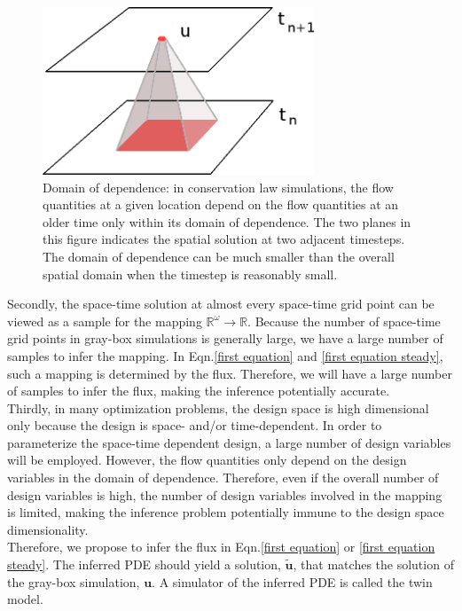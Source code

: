 \documentclass[a4paper,onecolumn]{article}
\theoremstyle{remark}
\begin{document}
\begin{figure}[H]\begin{center}
    \includegraphics[height=5cm]{locality.png}
    \caption{Domain of dependence: in conservation law simulations,
             the flow quantities at a given location
             depend on the flow quantities at an older time only within its
             domain of dependence. The two planes in this figure indicates the spatial 
             solution at two adjacent timesteps.
             The domain of dependence can be much smaller
             than the overall spatial domain when the timestep is reasonably small.}
    \label{locality}
\end{center}\end{figure}

\indent Secondly, the space-time solution at almost {every} space-time grid point can be viewed
as a sample for the mapping $\mathbb{R}^\omega \rightarrow \mathbb{R}$. 
Because the number of space-time grid points in gray-box simulations is generally large,
we have a large number of samples to infer the mapping. 
In Eqn.\eqref{first equation} and \eqref{first equation steady},
such a mapping is determined by the flux.
Therefore, we will have a large number of samples to infer the flux,
making the inference potentially accurate.\\

\indent Thirdly, in many optimization problems, the design space is high dimensional only because
the design is space- and/or time-dependent. In order to parameterize the space-time dependent
design, a large number of design variables will be employed. However, 
the flow quantities only depend on the design variables in the domain of dependence.
Therefore, even if the overall number of design variables is high, the number of design variables
involved in the mapping is limited, making the inference problem potentially
immune to the design space dimensionality.\\

\indent Therefore, we propose to infer the flux in Eqn.\eqref{first equation} or
\eqref{first equation steady}. The inferred
PDE should yield a solution, $\tilde{\boldsymbol{u}}$, that matches 
the solution of the gray-box simulation, $\boldsymbol{u}$.
A simulator of the inferred PDE is called the {twin model}.
\end{document}
